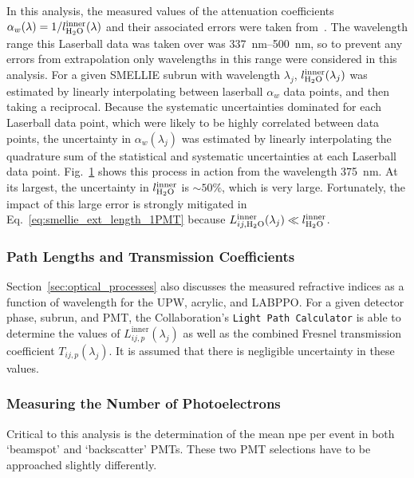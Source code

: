 In this analysis, the measured values of the attenuation coefficients $\alpha_{w}(\lambda) = 1/l_{\ce{H_{2}O}}^{\mathrm{inner}}(\lambda)$ and their associated errors were taken from~\cite{andersonOpticalCalibrationSNO2021}. The wavelength range this Laserball data was taken over was \SIrange{337}{500}{\nm}, so to prevent any errors from extrapolation only wavelengths in this range were considered in this analysis. For a given SMELLIE subrun with wavelength $\lambda_{j}$, $l_{\ce{H_{2}O}}^{\mathrm{inner}}(\lambda_{j})$ was estimated by linearly interpolating between laserball $\alpha_{w}$ data points, and then taking a reciprocal. Because the systematic uncertainties dominated for each Laserball data point, which were likely to be highly correlated between data points, the uncertainty in $\alpha_{w}(\lambda_{j})$ was estimated by linearly interpolating the quadrature sum of the statistical and systematic uncertainties at each Laserball data point. Fig.~\ref{fig:smellie_laserball_water_ext_length_est} shows this process in action from the wavelength \SI{375}{\nm}. At its largest, the uncertainty in $l_{\ce{H_{2}O}}^{\mathrm{inner}}$ is $\sim50\%$, which is very large. Fortunately, the impact of this large error is strongly mitigated in Eq.~\ref{eq:smellie_ext_length_1PMT} because $L_{ij,\ce{H_{2}O}}^{\mathrm{inner}}(\lambda_{j})\ll l_{\ce{H_{2}O}}^{\mathrm{inner}}$.

\begin{figure}
    \centering
    \caption[]{}
    \label{fig:smellie_laserball_water_ext_length_est}
\end{figure}

\subsubsection{Path Lengths and Transmission Coefficients}
Section~\ref{sec:optical_processes} also discusses the measured refractive indices as a function of wavelength for the UPW, acrylic, and LABPPO. For a given detector phase, subrun, and PMT, the Collaboration's \texttt{Light Path Calculator} is able to determine the values of $L_{ij,p}^{\mathrm{inner}}(\lambda_{j})$ as well as the combined Fresnel transmission coefficient $T_{ij,p}(\lambda_{j})$. It is assumed that there is negligible uncertainty in these values.

\subsubsection{Measuring the Number of Photoelectrons}
Critical to this analysis is the determination of the mean npe per event in both `beamspot' and `backscatter' PMTs. These two PMT selections have to be approached slightly differently.

